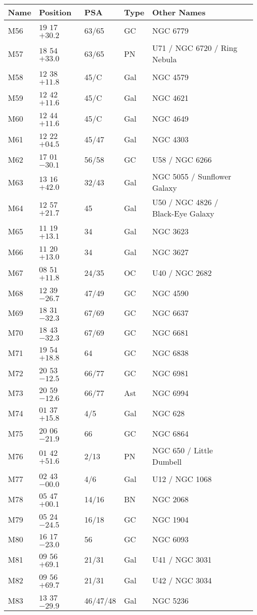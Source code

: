 \begin{table}[p]
\setlength{\tabcolsep}{3pt}
\scriptsize
\begin{tabular}{llllll}
\hline
Name&Position&PSA&Type&Other Names\\
\hline
M56&$19$ $17$ $+30.2$&63/65&GC&NGC 6779\\
M57&$18$ $54$ $+33.0$&63/65&PN&U71 / NGC 6720 / Ring Nebula\\
M58&$12$ $38$ $+11.8$&45/C&Gal&NGC 4579\\
M59&$12$ $42$ $+11.6$&45/C&Gal&NGC 4621\\
M60&$12$ $44$ $+11.6$&45/C&Gal&NGC 4649\\
M61&$12$ $22$ $+04.5$&45/47&Gal&NGC 4303\\
M62&$17$ $01$ $-30.1$&56/58&GC&U58 / NGC 6266\\
M63&$13$ $16$ $+42.0$&32/43&Gal&NGC 5055 / Sunflower Galaxy\\
M64&$12$ $57$ $+21.7$&45&Gal&U50 / NGC 4826 / Black-Eye Galaxy\\
M65&$11$ $19$ $+13.1$&34&Gal&NGC 3623\\
M66&$11$ $20$ $+13.0$&34&Gal&NGC 3627\\
M67&$08$ $51$ $+11.8$&24/35&OC&U40 / NGC 2682\\
M68&$12$ $39$ $-26.7$&47/49&GC&NGC 4590\\
M69&$18$ $31$ $-32.3$&67/69&GC&NGC 6637\\
M70&$18$ $43$ $-32.3$&67/69&GC&NGC 6681\\
M71&$19$ $54$ $+18.8$&64&GC&NGC 6838\\
M72&$20$ $53$ $-12.5$&66/77&GC&NGC 6981\\
M73&$20$ $59$ $-12.6$&66/77&Ast&NGC 6994\\
M74&$01$ $37$ $+15.8$&4/5&Gal&NGC 628\\
M75&$20$ $06$ $-21.9$&66&GC&NGC 6864\\
M76&$01$ $42$ $+51.6$&2/13&PN&NGC 650 / Little Dumbell\\
M77&$02$ $43$ $-00.0$&4/6&Gal&U12 / NGC 1068\\
M78&$05$ $47$ $+00.1$&14/16&BN&NGC 2068\\
M79&$05$ $24$ $-24.5$&16/18&GC&NGC 1904\\
M80&$16$ $17$ $-23.0$&56&GC&NGC 6093\\
M81&$09$ $56$ $+69.1$&21/31&Gal&U41 / NGC 3031\\
M82&$09$ $56$ $+69.7$&21/31&Gal&U42 / NGC 3034\\
M83&$13$ $37$ $-29.9$&46/47/48&Gal&NGC 5236\\

\end{tabular}
\end{table}
